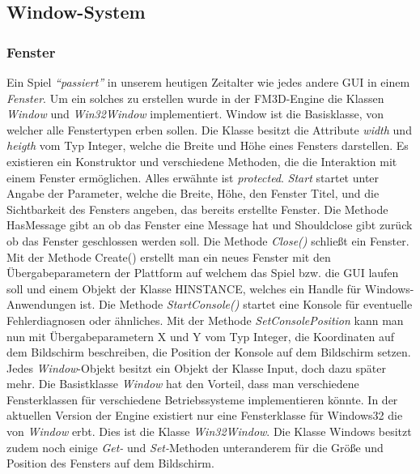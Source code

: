 \subsection{Window-System}

\subsubsection{Fenster}
Ein Spiel \textit{"`passiert"'} in unserem heutigen Zeitalter wie jedes andere GUI in einem \textit{Fenster}. Um ein solches zu erstellen wurde in der FM3D-Engine die Klassen \textit{Window} und \textit{Win32Window} implementiert.
Window ist die Basisklasse, von welcher alle Fenstertypen erben sollen.
Die Klasse besitzt die Attribute \textit{width} und \textit{heigth} vom Typ Integer, welche die Breite und Höhe eines Fensters darstellen.
Es existieren ein Konstruktor und verschiedene Methoden, die die Interaktion mit einem Fenster ermöglichen. Alles erwähnte ist \textit{protected}.
\textit{Start} startet unter Angabe der Parameter, welche die Breite, Höhe, den Fenster Titel, und die Sichtbarkeit des Fensters angeben, das bereits erstellte Fenster.
Die Methode HasMessage gibt an ob das Fenster eine Message hat und
Shouldclose gibt zurück ob das Fenster geschlossen werden soll.
Die Methode \textit{Close()} schließt ein Fenster. Mit der Methode Create() erstellt man ein neues Fenster mit den Übergabeparametern der Plattform auf welchem das Spiel bzw. die GUI laufen soll und einem Objekt der Klasse HINSTANCE, welches ein Handle für Windows-Anwendungen ist. Die Methode \textit{StartConsole()} startet eine Konsole für eventuelle Fehlerdiagnosen oder ähnliches. Mit der Methode \textit{SetConsolePosition} kann man nun mit Übergabeparametern X und Y vom Typ Integer, die Koordinaten auf dem Bildschirm beschreiben, die Position der Konsole auf dem Bildschirm setzen.
Jedes \textit{Window}-Objekt besitzt ein Objekt der Klasse Input, doch dazu später mehr. Die Basistklasse \textit{Window} hat den Vorteil, dass man verschiedene Fensterklassen für verschiedene Betriebssysteme implementieren könnte. In der aktuellen Version der Engine existiert nur eine Fensterklasse für Windows32 die von \textit{Window} erbt. Dies ist die Klasse  \textit{Win32Window}. Die Klasse Windows besitzt zudem noch einige \textit{Get-} und \textit{Set-}Methoden unteranderem für die Größe und Position des Fensters auf dem Bildschirm.

